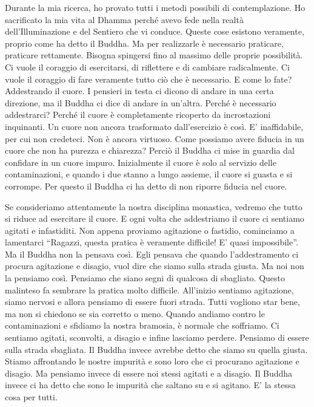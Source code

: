 Durante la mia ricerca, ho provato tutti i metodi possibili di
contemplazione. Ho sacrificato la mia vita al Dhamma perché avevo fede
nella realtà dell'Illuminazione e del Sentiero che vi conduce. Queste
cose esistono veramente, proprio come ha detto il Buddha. Ma per
realizzarle è necessario praticare, praticare rettamente. Bisogna
spingersi fino al massimo delle proprie possibilità. Ci vuole il
coraggio di esercitarsi, di riflettere e di cambiare radicalmente. Ci
vuole il coraggio di fare veramente tutto ciò che è necessario. E come
lo fate? Addestrando il cuore. I pensieri in testa ci dicono di andare
in una certa direzione, ma il Buddha ci dice di andare in un'altra.
Perché è necessario addestrarci? Perché il cuore è completamente
ricoperto da incrostazioni inquinanti. Un cuore non ancora trasformato
dall'esercizio è così. E' inaffidabile, per cui non credeteci. Non è
ancora virtuoso. Come possiamo avere fiducia in un cuore che non ha
purezza e chiarezza? Perciò il Buddha ci mise in guardia dal confidare
in un cuore impuro. Inizialmente il cuore è solo al servizio delle
contaminazioni, e quando i due stanno a lungo assieme, il cuore si
guasta e si corrompe. Per questo il Buddha ci ha detto di non riporre
fiducia nel cuore.

Se consideriamo attentamente la nostra disciplina monastica, vedremo che
tutto si riduce ad esercitare il cuore. E ogni volta che addestriamo il
cuore ci sentiamo agitati e infastiditi. Non appena proviamo agitazione
o fastidio, cominciamo a lamentarci ``Ragazzi, questa pratica è
veramente difficile! E' quasi impossibile''. Ma il Buddha non la pensava
così. Egli pensava che quando l'addestramento ci procura agitazione e
disagio, vuol dire che siamo sulla strada giusta. Ma noi non la pensiamo
così. Pensiamo che siano segni di qualcosa di sbagliato. Questo
malinteso fa sembrare la pratica molto difficile. All'inizio sentiamo
agitazione, siamo nervosi e allora pensiamo di essere fuori strada.
Tutti vogliono star bene, ma non si chiedono se sia corretto o meno.
Quando andiamo contro le contaminazioni e sfidiamo la nostra bramosia, è
normale che soffriamo. Ci sentiamo agitati, sconvolti, a disagio e
infine lasciamo perdere. Pensiamo di essere sulla strada sbagliata. Il
Buddha invece avrebbe detto che siamo su quella giusta. Stiamo
affrontando le nostre impurità e sono loro che ci procurano agitazione e
disagio. Ma pensiamo invece di essere noi stessi agitati e a disagio. Il
Buddha invece ci ha detto che sono le impurità che saltano su e si
agitano. E' la stessa cosa per tutti.

